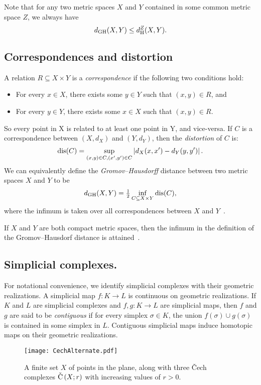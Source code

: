 \documentclass[11pt, reqno, english]{amsart}
\begin{document}
Note that for any two metric spaces $X$ and $Y$ contained in some common metric space $Z$, we always have
\begin{equation}
\label{eq:dgh-le-dh}
d_{\mathrm{GH}}(X,Y) \le d_{\mathrm{H}}^Z(X,Y).
\end{equation}


\subsection*{Correspondences and distortion}

A relation $R\subseteq X\times Y$ is a \emph{correspondence} if the following two conditions hold:
\begin{itemize}
\item For every $x \in X$, there exists some $y \in Y$ such that $(x,y) \in R$, and
\item For every $y \in Y$, there exists some $x \in X$ such that $(x,y) \in R$.
\end{itemize}
So every point in X is related to at least one point in Y, and vice-versa.
If $C$ is a correspondence between $(X,d_X)$ and $(Y,d_Y)$, then the \emph{distortion} of $C$ is:
\[\mathrm{dis}(C)=\sup_{(x,y)\in C,(x',y')\in C} \left|d_{X}(x,x')-d_{Y}(y,y')\right|.\]
We can equivalently define the \emph{Gromov--Hausdorff} distance between two metric spaces $X$ and $Y$ to be
\[d_{\mathrm{GH}}(X,Y) = \tfrac{1}{2} \inf_{C \subseteq X \times Y}\mathrm{dis}(C),\]
where the infimum is taken over all correspondences between $X$ and $Y$~\cite{BuragoBuragoIvanov,kalton1999distances}.

If $X$ and $Y$ are both compact metric spaces, then the infimum in the definition of the Gromov--Hausdorf distance is attained~\cite{ivanov2016realizations}.


\subsection*{Simplicial complexes.}

For notational convenience, we identify simplicial complexes with their geometric realizations.
A simplicial map $f\colon K\to L$ is continuous on geometric realizations.
If $K$ and $L$ are simplicial complexes and $f, g\colon K\to L$ are simplicial maps, then $f$ and $g$ are said to be \emph{contiguous} if for every simplex $\sigma\in K$, the union $f(\sigma)\cup g(\sigma)$ is contained in some simplex in $L$.
Contiguous simplicial maps induce homotopic maps on their geometric realizations.

\begin{figure}[htb]
\centering
\texttt{[image: CechAlternate.pdf]}
\caption{A finite set $X$ of points in the plane, along with three \v{C}ech complexes $\mathrm{\check{C}}\left(X;r\right)$ with increasing values of $r>0$.}
\label{fig:cech}
\end{figure}
\end{document}
